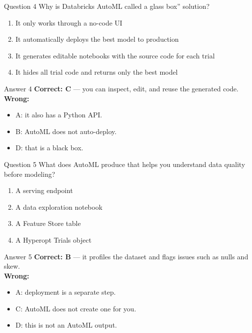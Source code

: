 \documentclass[aspectratio=169,11pt]{beamer}
\begin{document}
	\begin{frame}{Question 4}
		Why is Databricks AutoML called a \texttt{}glass box'' solution?
		\begin{enumerate}[label=\Alph*.]
			\item It only works through a no-code UI
			\item It automatically deploys the best model to production
			\item It generates editable notebooks with the source code for each trial
			\item It hides all trial code and returns only the best model
		\end{enumerate}
	\end{frame}
	\begin{frame}{Answer 4}
		\textbf{Correct: C} --- you can inspect, edit, and reuse the generated code.\\
		\vspace{0.5em}
		\textbf{Wrong:}
		\begin{itemize}
			\item A: it also has a Python API.
			\item B: AutoML does not auto-deploy.
			\item D: that is a black box.
		\end{itemize}
	\end{frame}
	
	\begin{frame}{Question 5}
		What does AutoML produce that helps you understand data quality before modeling?
		\begin{enumerate}[label=\Alph*.]
			\item A serving endpoint
			\item A data exploration notebook
			\item A Feature Store table
			\item A Hyperopt Trials object
		\end{enumerate}
	\end{frame}
	\begin{frame}{Answer 5}
		\textbf{Correct: B} --- it profiles the dataset and flags issues such as nulls and skew.\\
		\vspace{0.5em}
		\textbf{Wrong:}
		\begin{itemize}
			\item A: deployment is a separate step.
			\item C: AutoML does not create one for you.
			\item D: this is not an AutoML output.
		\end{itemize}
	\end{frame}
	
\end{document}
